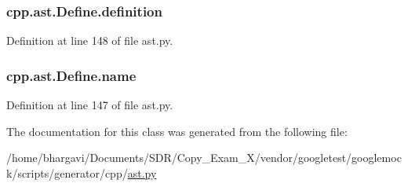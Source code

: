 \subsubsection[{\texorpdfstring{definition}{definition}}]{\setlength{\rightskip}{0pt plus 5cm}cpp.\+ast.\+Define.\+definition}\hypertarget{classcpp_1_1ast_1_1_define_a0c636652dfeb2f15e62793afea1153c9}{}\label{classcpp_1_1ast_1_1_define_a0c636652dfeb2f15e62793afea1153c9}


Definition at line 148 of file ast.\+py.

\subsubsection[{\texorpdfstring{name}{name}}]{\setlength{\rightskip}{0pt plus 5cm}cpp.\+ast.\+Define.\+name}\hypertarget{classcpp_1_1ast_1_1_define_a8879216f09e88f79d7baa49bcfa10ebd}{}\label{classcpp_1_1ast_1_1_define_a8879216f09e88f79d7baa49bcfa10ebd}


Definition at line 147 of file ast.\+py.



The documentation for this class was generated from the following file\+:\begin{DoxyCompactItemize}
\item 
/home/bhargavi/\+Documents/\+S\+D\+R/\+Copy\+\_\+\+Exam\+\_\+X/vendor/googletest/googlemock/scripts/generator/cpp/\hyperlink{ast_8py}{ast.\+py}\end{DoxyCompactItemize}
